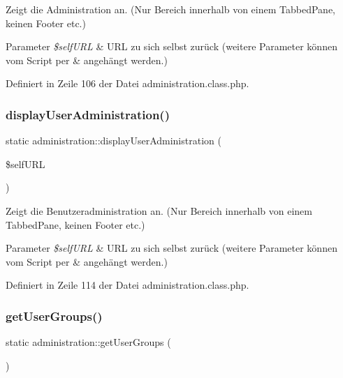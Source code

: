 Zeigt die Administration an. (Nur Bereich innerhalb von einem Tabbed\+Pane, keinen Footer etc.) 
\begin{DoxyParams}{Parameter}
{\em \$self\+U\+RL} & U\+RL zu sich selbst zurück (weitere Parameter können vom Script per \& angehängt werden.) \\
\hline
\end{DoxyParams}


Definiert in Zeile 106 der Datei administration.\+class.\+php.

\mbox{\label{classadministration_ab40ac15abebd8cd56a6c032357b202d8}} 
\subsubsection{\texorpdfstring{display\+User\+Administration()}{displayUserAdministration()}}
{\footnotesize\ttfamily static administration\+::display\+User\+Administration (\begin{DoxyParamCaption}\item[{}]{\$self\+U\+RL }\end{DoxyParamCaption})\hspace{0.3cm}{\ttfamily [static]}}

Zeigt die Benutzeradministration an. (Nur Bereich innerhalb von einem Tabbed\+Pane, keinen Footer etc.) 
\begin{DoxyParams}{Parameter}
{\em \$self\+U\+RL} & U\+RL zu sich selbst zurück (weitere Parameter können vom Script per \& angehängt werden.) \\
\hline
\end{DoxyParams}


Definiert in Zeile 114 der Datei administration.\+class.\+php.

\mbox{\label{classadministration_a51f141761c57486d166d15aa3f873534}} 
\subsubsection{\texorpdfstring{get\+User\+Groups()}{getUserGroups()}}
{\footnotesize\ttfamily static administration\+::get\+User\+Groups (\begin{DoxyParamCaption}{ }\end{DoxyParamCaption})\hspace{0.3cm}{\ttfamily [static]}}

